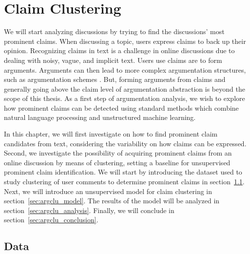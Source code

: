 \chapter{Claim Clustering}
\label{chap:argclu}


We will start analyzing discussions by trying to find the discussions' most prominent 
claims.
When discussing a topic, users express claims to back up their opinion. 
Recognizing claims in text is a challenge in online discussions due to 
dealing with noisy, vague, and implicit text. 
Users use claims are to form arguments. 
Arguments can then lead to more complex 
argumentation structures, such as argumentation schemes \citep{walton2008argumentation}. 
But, forming arguments from claims and generally going above the claim level of
argumentation abstraction is beyond the scope of this thesis. 
As a first step of argumentation analysis, we wish to explore how prominent
claims can be detected using standard methods which combine natural language
processing and unstructured machine learning. 

In this chapter, we will first investigate on how to find 
prominent claim candidates from text, considering the variability on how 
claims can be expressed. Second, we investigate the possibility of 
acquiring prominent claims from an online discussion by means of clustering, 
setting a baseline for unsupervised prominent claim identification. 
We will start by introducing the dataset used to study clustering of
user comments to determine prominent claims in section~\ref{sec:argclu_data}.
Next, we will introduce an unsupervised
model for claim clustering in section~\ref{sec:argclu_model}.
The results of the model will be analyzed in section~\ref{sec:argclu_analysis}.
Finally, we will conclude in section~\ref{sec:argclu_conclusion}. 

\section{Data}
\label{sec:argclu_data}


